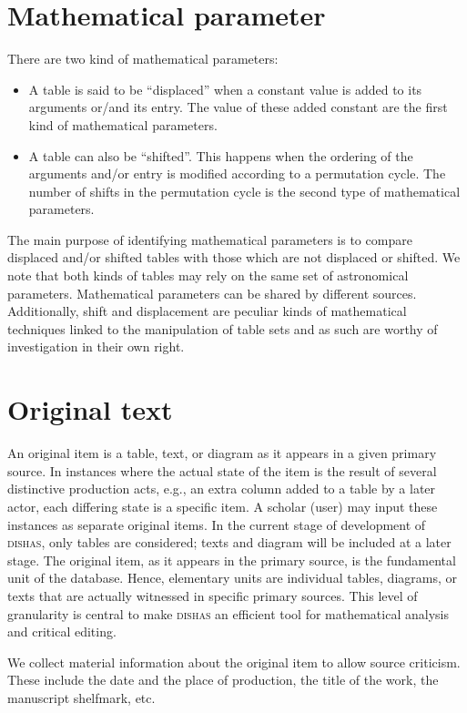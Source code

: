\documentclass[a4paper,12pt,twoside]{book}
\begin{document}
		\section{Mathematical parameter}
	There are two kind of mathematical parameters:
	\begin{itemize}
		\item A table is said to be “displaced” when a constant value is added to its arguments or/and its entry. The value of these added constant are the first kind of mathematical parameters.
		\item A table can also be “shifted”. This happens when the ordering of the arguments and/or entry is modified according to a permutation cycle. The number of shifts in the permutation cycle is the second type of mathematical parameters.
	\end{itemize}
	The main purpose of identifying mathematical parameters is to compare displaced and/or shifted tables with those which are not displaced or shifted. We note that both kinds of tables may rely on the same set of astronomical parameters. Mathematical parameters can be shared by different sources. Additionally, shift and displacement are peculiar kinds of mathematical techniques linked to the manipulation of table sets and as such are worthy of investigation in their own right.
	
		\section{Original text}
	An original item is a table, text, or diagram as it appears in a given primary source. In instances where the actual state of the item is the result of several distinctive production acts, e.g., an extra column added to a table by a later actor, each differing state is a specific item. A scholar (user) may input these instances as separate original items. In the current stage of development of \textsc{dishas}, only tables are considered; texts and diagram will be included at a later stage.
	The original item, as it appears in the primary source, is the fundamental unit of the database. Hence, elementary units are individual tables, diagrams, or texts that are actually witnessed in specific primary sources. This level of granularity is central to make \textsc{dishas} an efficient tool for mathematical analysis and critical editing.
	
	We collect material information about the original item to allow source criticism. These include the date and the place of production, the title of the work, the manuscript shelfmark, etc.
	
\end{document}
